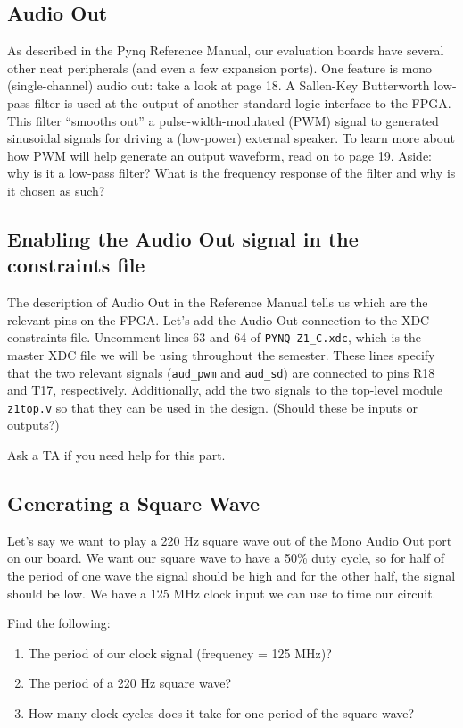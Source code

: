 \documentclass[11pt]{article}
\begin{document}
\subsection{Audio Out}

As described in the Pynq Reference Manual, our evaluation boards have several other neat peripherals (and even a few expansion ports). One feature is mono (single-channel) audio out: take a look at page 18. A Sallen-Key Butterworth low-pass filter is used at the output of another standard logic interface to the FPGA. This filter ``smooths out'' a pulse-width-modulated (PWM) signal to generated sinusoidal signals for driving a (low-power) external speaker. To learn more about how PWM will help generate an output waveform, read on to page 19. Aside: why is it a low-pass filter? What is the frequency response of the filter and why is it chosen as such?

\subsection{Enabling the Audio Out signal in the constraints file}

The description of Audio Out in the Reference Manual tells us which are the relevant pins on the FPGA. Let's add the Audio Out connection to the XDC constraints file. Uncomment lines 63 and 64 of \verb|PYNQ-Z1_C.xdc|, which is the master XDC file we will be using throughout the semester. These lines specify that the two relevant signals (\verb|aud_pwm| and \verb|aud_sd|) are connected to pins R18 and T17, respectively. Additionally, add the two signals to the top-level module \verb|z1top.v| so that they can be used in the design. (Should these be inputs or outputs?)

Ask a TA if you need help for this part.

\subsection{Generating a Square Wave}
Let's say we want to play a 220 Hz square wave out of the Mono Audio Out port on our board. We want our square wave to have a 50\% duty cycle, so for half of the period of one wave the signal should be high and for the other half, the signal should be low. We have a 125 MHz clock input we can use to time our circuit.

Find the following:
\begin{enumerate}
  \item The period of our clock signal (frequency = 125 MHz)?
  \item The period of a 220 Hz square wave?
  \item How many clock cycles does it take for one period of the square wave?
\end{enumerate}
\end{document}
